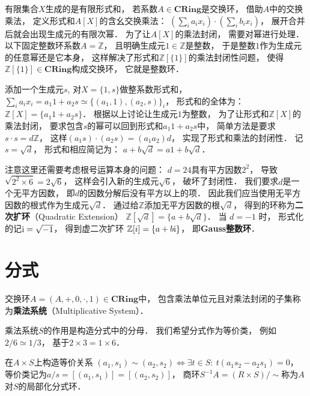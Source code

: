 有限集合$X$生成的是有限形式和，
若系数$A \in \textbf{CRing}$是交换环，
借助$A$中的交换乘法，
定义形式和$A[X]$的含幺交换乘法：
$(\sum_i a_i x_i) \cdot (\sum_i b_i x_i)$，
展开合并后就会出现生成元的有限次幂．
为了让$A[X]$的乘法封闭，
需要对幂进行处理．
以下固定整数环系数$A = \mathbb Z$，
且明确生成元$1 \in \mathbb Z$是整数，
于是整数$1$作为生成元的任意幂还是它本身，
这样解决了形式和$\mathbb Z[\{1\}]$的乘法封闭性问题，
使得$\mathbb Z[\{1\}] \in\textbf{CRing}$构成交换环，
它就是整数环．

添加一个生成元$s$,
对$X = \{1,s\}$做整系数形式和，
$\sum_i a_i x_i = a_1 1 + a_2 s \simeq \{ (a_1,1),(a_2,s) \}_i$，
形式和的全体为：
$\mathbb Z[X] = \{ a_1 1 + a_2 s \}$．
根据以上讨论让生成元$1$为整数，
为了让形式和$\mathbb Z[X]$的乘法封闭，
要求包含$s$的幂可以回到形式和$a_1 1 + a_2 s$中，
简单方法是要求$s\cdot s = d \mathbb Z$，
这样$(a_1 s) \cdot (a_2 s) = (a_1 a_2)d$，
实现了形式和乘法的封闭性．
记$s = \sqrt d$，
形式和相应简记为：
$a + b\sqrt{d} = a 1 + b \sqrt{d}$．

注意这里还需要考虑根号运算本身的问题：
$d = 24$具有平方因数$2^2$，
导致$\sqrt{2^2 \times 6} = 2 \sqrt 6$，
这样会引入新的生成元$\sqrt 6$，
破坏了封闭性．
我们要求$d$是一个无平方因数，
即$d$的因数分解后没有平方以上的项．
因此我们应当使用无平方因数的根式作为生成元$\sqrt d$．
通过给$\mathbb Z$添加无平方因数的根$\sqrt d$，
得到的环称为\textbf{二次扩环}（Quadratic Extension）
$\mathbb{Z}[\sqrt{d}] = \{a + b\sqrt d\}$．
当 $d=-1$ 时，
形式化的记$ \text i = \sqrt{-1}$，
得到虚二次扩环 $\mathbb{Z}[i] = \{a + b\text i\}$，
即\textbf{Gauss整数环}．


\section{分式}

\begin{framed}
\noindent
交换环$A = (A,+,0,\cdot,1) \in \textbf{CRing}$中，
包含乘法单位元且对乘法封闭的子集称为\textbf{乘法系统}（Multiplicative System）．
\end{framed}

乘法系统$S$的作用是构造分式中的分母．
我们希望分式作为等价类，
例如$2/6 \simeq 1/3$，
基于$2 \times 3 = 1 \times 6$．

\begin{framed}
\noindent
在$A \times S$上构造等价关系
$(a_1,s_1) \sim (a_2,s_2) \Leftrightarrow \exists t \in S:\ t(a_1s_2 - a_2s_1) = 0$，
等价类记为$a/s=[(a_1,s_1)]=[(a_2,s_2)]$，
商环$S^{-1}A = (R \times S)/\sim$称为$A$对$S$的局部化分式环．
\end{framed}

